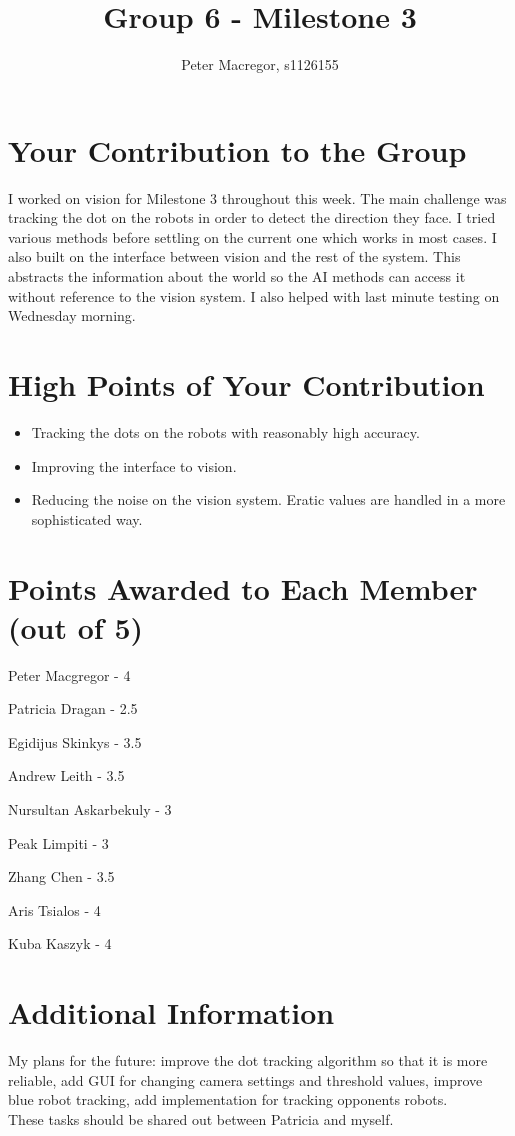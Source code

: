 \documentclass[dvips]{article}
\begin{document}
\sloppy
\title{Group 6 - Milestone 3}
 
\author{Peter Macregor, s1126155}
 
\maketitle

\section{Your Contribution to the Group}
I worked on vision for Milestone 3 throughout this week. The main challenge
was tracking the dot on the robots in order to detect the direction they face.
I tried various methods before settling on the current one which works in most cases.
I also built on the interface between vision and the rest of the system. This
abstracts the information about the world so the AI methods can access it without
reference to the vision system. I also helped with last minute testing on Wednesday morning.

\section{High Points of Your Contribution}
\begin{itemize}
  \item Tracking the dots on the robots with reasonably high accuracy.
  \item Improving the interface to vision.
  \item Reducing the noise on the vision system. Eratic values are handled in a more sophisticated way.
\end{itemize} 

\section{Points Awarded to Each Member (out of 5)}
\begin{itemize}
\begin{multicols}{2}
\item Peter Macgregor - 4
\item Patricia Dragan - 2.5
\item Egidijus Skinkys - 3.5
\item Andrew Leith - 3.5
\item Nursultan Askarbekuly - 3
\item Peak Limpiti - 3
\item Zhang Chen - 3.5
\item Aris Tsialos - 4
\item Kuba Kaszyk - 4
\end{multicols}
\end{itemize}

\section{Additional Information}
My plans for the future: improve the dot tracking algorithm so that it is
more reliable, add GUI for changing camera settings and threshold values,
improve blue robot tracking, add implementation for tracking opponents robots.\\
These tasks should be shared out between Patricia and myself.
\end{document}
